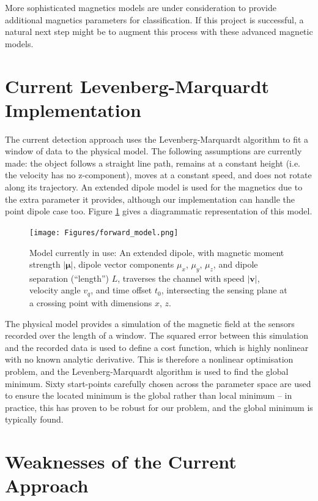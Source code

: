 \documentclass[10pt, a4paper, twocolumn]{article} %
\begin{document}
More sophisticated magnetics models are under consideration to provide additional magnetics parameters for classification. If this project is successful, a natural next step might be to augment this process with these advanced magnetic models.

\section{Current Levenberg-Marquardt Implementation}

The current detection approach uses the Levenberg-Marquardt algorithm to fit a window of data to the physical model. The following assumptions are currently made: the object follows a straight line path, remains at a constant height (i.e. the velocity has no z-component), moves at a constant speed, and does not rotate along its trajectory. An extended dipole model is used for the magnetics due to the extra parameter it provides, although our implementation can handle the point dipole case too. Figure \ref{forward_model} gives a diagrammatic representation of this model.

\begin{figure}
	\texttt{[image: Figures/forward\_model.png]} %
	\caption{Model currently in use: An extended dipole, with magnetic moment strength $|\boldsymbol{\mu}|$, dipole vector components $\mu_x$, $\mu_y$, $\mu_z$, and dipole separation (“length”) $L$, traverses the channel with speed $|\mathbf{v}|$, velocity angle $v_q$, and time offset $t_0$, intersecting the sensing plane at a crossing point with dimensions $x$, $z$.}
	\label{forward_model}
\end{figure}

The physical model provides a simulation of the magnetic field at the sensors recorded over the length of a window. The squared error between this simulation and the recorded data is used to define a cost function, which is highly nonlinear with no known analytic derivative. This is therefore a nonlinear optimisation problem, and the Levenberg-Marquardt algorithm is used to find the global minimum. Sixty start-points carefully chosen across the parameter space are used to ensure the located minimum is the global rather than local minimum – in practice, this has proven to be robust for our problem, and the global minimum is typically found.

\section{Weaknesses of the Current Approach}
\end{document}
